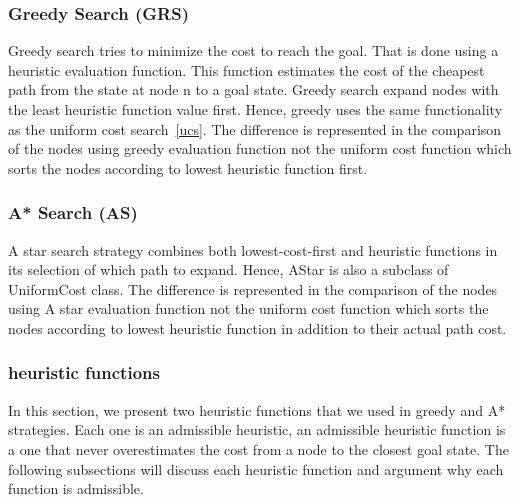 \documentclass{article}
\begin{document}
\subsubsection{Greedy Search (GRS)}
Greedy search tries to minimize the cost to reach the goal. That is done using a heuristic evaluation function. This function estimates the cost of the cheapest path from the state at node n to a goal state. Greedy search expand nodes with the least heuristic function value first. Hence, greedy uses the same functionality as the uniform cost search~\ref{ucs}. The difference is represented in the comparison of the nodes using greedy evaluation function not the uniform cost function which sorts the nodes according to lowest heuristic function first.

\subsubsection{A* Search (AS)}
A star search strategy combines both lowest-cost-first and heuristic functions in its selection of which path to expand. Hence, AStar is also a subclass of UniformCost class. The difference is represented in the comparison of the nodes using A star evaluation function not the uniform cost function which sorts the nodes according to lowest heuristic function in addition to their actual path cost.

\subsubsection{heuristic functions}
In this section, we present two heuristic functions that we used in greedy and A* strategies. Each one is an admissible heuristic, an admissible heuristic function is a one that never overestimates the cost from a node to the closest goal state. The following subsections will discuss each heuristic function and argument why each function is admissible.
\end{document}
